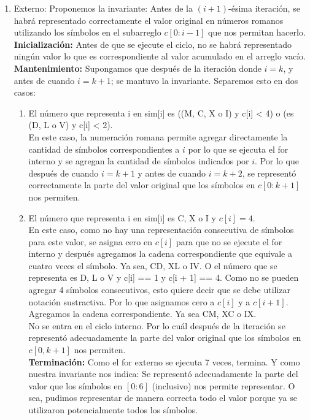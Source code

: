 \documentclass[12pt]{article}
\begin{document}
\begin{itemize}
\begin{enumerate}
        \item Externo:
        Proponemos la invariante: Antes de la $(i+1)$-ésima iteración, se habrá representado correctamente el valor original en números romanos utilizando los símbolos en el subarreglo $c[0:i-1]$ que nos permitan hacerlo.
        \textbf{Inicialización:} Antes de que se ejecute el ciclo, no se habrá representado ningún valor lo que es correspondiente al valor acumulado en el arreglo vacío.\\
        \textbf{Mantenimiento:} Supongamos que después de la iteración donde $i = k$, y antes de cuando $i = k + 1$; se mantuvo la invariante.
        Separemos esto en dos casos:
        \begin{enumerate}
            \item El número que representa i en sim[i] es ((M, C, X o I) y c[i] < 4) o (es (D, L o V) y c[i] < 2).\\
            En este caso, la numeración romana permite agregar directamente la cantidad de símbolos correspondientes a $i$
            por lo que se ejecuta el for interno y se agregan la cantidad de símbolos indicados por $i$. Por lo que después de cuando $i = k + 1$ y antes de cuando $i = k + 2$, se representó correctamente la parte del valor original que los símbolos en $c[0: k + 1]$ nos permiten.
            \item El número que representa i en sim[i] es
            C, X o I y $c[i] = 4$.\\
            En este caso, como no hay una representación consecutiva de símbolos para este valor, se asigna cero en $c[i]$ para que no se ejecute el for interno y después agregamos la cadena correspondiente que equivale a cuatro veces el símbolo. Ya sea, CD, XL o IV.
            O el número que se representa es D, L o V y c[i] == 1 y c[i + 1] == 4. Como no se pueden agregar 4 símbolos consecutivos, esto quiere decir que se debe utilizar notación sustractiva. Por lo que asignamos cero a $c[i]$ y a $c[i + 1]$. Agregamos la cadena correspondiente. Ya sea CM, XC o IX.\\
            No se entra en el ciclo interno.
            Por lo cuál después de la iteración se representó adecuadamente la parte del valor original que los símbolos en $c[0,k + 1]$ nos permiten.\\
            \textbf{Terminación:} Como el for externo se ejecuta 7 veces, termina. Y como nuestra invariante nos indica: Se representó adecuadamente la parte del valor que los símbolos en $[0:6]$ (inclusivo) nos permite representar. O sea, pudimos representar de manera correcta todo el valor porque ya se utilizaron potencialmente todos los símbolos.
        \end{enumerate}


\end{enumerate}
\end{itemize}
\end{document}
